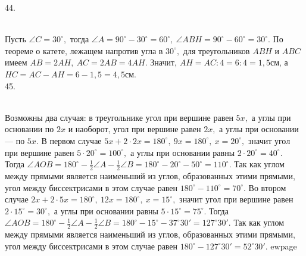 44. \begin{figure}[ht!]
\end{figure}\\
Пусть $\angle C=30^\circ,$ тогда $\angle A=90^\circ-30^\circ=60^\circ,\ \angle ABH=90^\circ-60^\circ=30^\circ.$ По теореме о катете, лежащем напротив угла в $30^\circ,$ для треугольников $ABH$ и $ABC$ имеем $AB=2AH,\ AC=2AB=4AH.$ Значит, $AH=AC:4=6:4=1,5$см, а $HC=AC-AH=6-1,5=4,5$см.\\
45. \begin{figure}[ht!]
\end{figure}\\
Возможны два случая: в треугольнике угол при вершине равен $5x,$ а углы при основании по $2x$ и наоборот, угол при вершине равен $2x,$ а углы при основании --- по $5x.$ В первом случае $5x+2\cdot2x=180^\circ,\ 9x=180^\circ,\ x=20^\circ,$ значит угол при вершине равен $5\cdot20^\circ=100^\circ,$ а углы при основании равны $2\cdot20^\circ=40^\circ.$ Тогда $\angle AOB=180^\circ-\frac{1}{2}\angle A-\frac{1}{2}\angle B=180^\circ-20^\circ-50^\circ=110^\circ.$ Так как углом между прямыми является наименьший из углов, образованных этими прямыми, угол между биссектрисами в этом случае равен $180^\circ-110^\circ=70^\circ.$ Во втором случае $2x+2\cdot5x=180^\circ,\ 12x=180^\circ,\ x=15^\circ,$ значит угол при вершине равен $2\cdot15^\circ=30^\circ,$ а углы при основании равны $5\cdot15^\circ=75^\circ.$
Тогда $\angle AOB=180^\circ-\frac{1}{2}\angle A-\frac{1}{2}\angle B=180^\circ-15^\circ-37^\circ30'=127^\circ30'.$ Так как углом между прямыми является наименьший из углов, образованных этими прямыми, угол между биссектрисами в этом случае равен $180^\circ-127^\circ30'=52^\circ30'.$
ewpage

